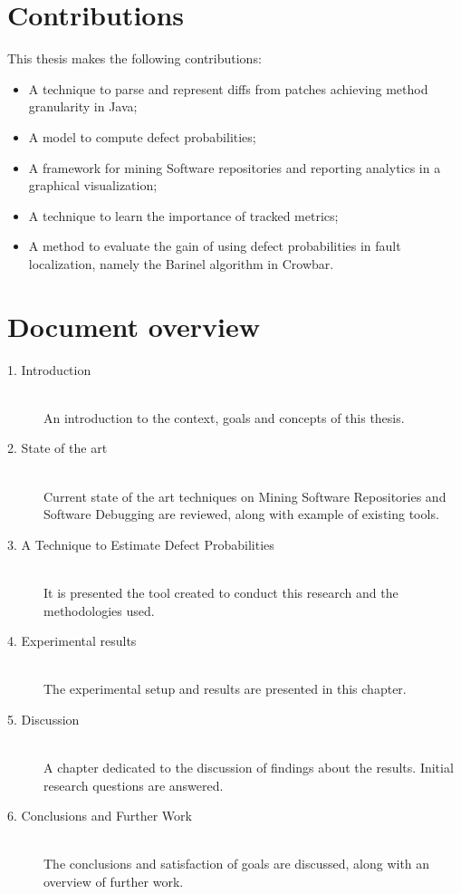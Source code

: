 \section{Contributions}
This thesis makes the following contributions:

\begin{itemize}
\item A technique to parse and represent diffs from patches achieving method
granularity in Java;
\item A model to compute defect probabilities;
\item A framework for mining Software repositories and reporting analytics
in a graphical visualization;
\item A technique to learn the importance of tracked metrics;
\item A method to evaluate the gain of using defect probabilities in fault
 localization, namely the Barinel algorithm in Crowbar.
\end{itemize}

\section{Document overview}
\begin{description}
  \item[1. Introduction] \hfill \\
  An introduction to the context, goals and concepts of this thesis.

  \item[2. State of the art] \hfill \\
  Current state of the art techniques on Mining Software Repositories and
  Software Debugging are reviewed, along with example of existing tools.

  \item[3. A Technique to Estimate Defect Probabilities] \hfill \\
  It is presented the tool created to conduct this research and the
  methodologies used.

  \item[4. Experimental results] \hfill \\
  The experimental setup and results are presented in this chapter.

  \item[5. Discussion] \hfill \\
  A chapter dedicated to the discussion of findings about the results.
  Initial research questions are answered.

  \item[6. Conclusions and Further Work] \hfill \\
  The conclusions and satisfaction of goals are discussed, along with an
  overview of further work.

\end{description}
